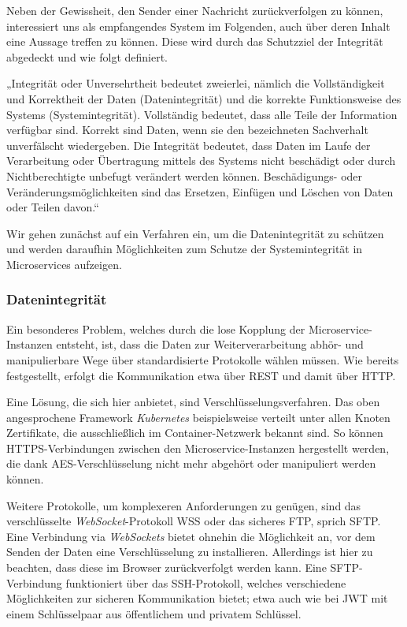 Neben der Gewissheit, den Sender einer Nachricht zurückverfolgen zu können, interessiert uns als empfangendes System im Folgenden, auch über deren Inhalt eine Aussage treffen zu können. Diese wird durch das Schutzziel der Integrität abgedeckt und wie folgt definiert.

„Integrität oder Unversehrtheit bedeutet zweierlei, nämlich die Vollständigkeit und Korrektheit der Daten (Datenintegrität) und die korrekte Funktionsweise des Systems (Systemintegrität). Vollständig bedeutet, dass alle Teile der Information verfügbar sind. Korrekt sind Daten, wenn sie den bezeichneten Sachverhalt unverfälscht wiedergeben. Die Integrität bedeutet, dass Daten im Laufe der Verarbeitung oder Übertragung mittels des Systems nicht beschädigt oder durch Nichtberechtigte unbefugt verändert werden können. Beschädigungs- oder Veränderungsmöglichkeiten sind das Ersetzen, Einfügen und Löschen von Daten oder Teilen davon.“ \cite{Bedner+10}

Wir gehen zunächst auf ein Verfahren ein, um die Datenintegrität zu schützen und werden daraufhin Möglichkeiten zum Schutze der Systemintegrität in Microservices aufzeigen.

\subsubsection{Datenintegrität}

Ein besonderes Problem, welches durch die lose Kopplung der Microservice-Instanzen entsteht, ist, dass die Daten zur Weiterverarbeitung abhör- und manipulierbare Wege über standardisierte Protokolle wählen müssen. Wie bereits festgestellt, erfolgt die Kommunikation etwa über REST und damit über HTTP. 

Eine Lösung, die sich hier anbietet, sind Verschlüsselungsverfahren. Das oben angesprochene Framework \textit{Kubernetes} beispielsweise verteilt unter allen Knoten Zertifikate, die ausschließlich im Container-Netzwerk bekannt sind. So können HTTPS-Verbindungen zwischen den Microservice-Instanzen hergestellt werden, die dank AES-Verschlüsselung nicht mehr abgehört oder manipuliert werden können.

Weitere Protokolle, um komplexeren Anforderungen zu genügen, sind das verschlüsselte \textit{WebSocket}-Protokoll WSS oder das sicheres FTP, sprich SFTP. Eine Verbindung via \textit{WebSockets} bietet ohnehin die Möglichkeit an, vor dem Senden der Daten eine Verschlüsselung zu installieren. Allerdings ist hier zu beachten, dass diese im Browser zurückverfolgt werden kann. Eine SFTP-Verbindung funktioniert über das SSH-Protokoll, welches verschiedene Möglichkeiten zur sicheren Kommunikation bietet; etwa auch wie bei JWT mit einem Schlüsselpaar aus öffentlichem und privatem Schlüssel.

